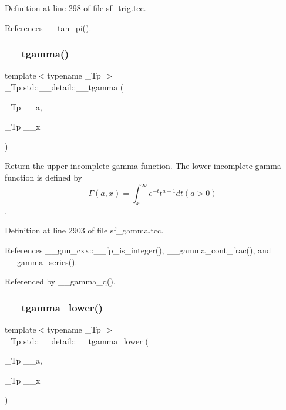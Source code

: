 Definition at line 298 of file sf\+\_\+trig.\+tcc.



References \+\_\+\+\_\+tan\+\_\+pi().

\mbox{\label{namespacestd_1_1____detail_ad2f6546e22348b07d992d522153d7d6b}} 
\subsubsection{\texorpdfstring{\+\_\+\+\_\+tgamma()}{\_\_tgamma()}}
{\footnotesize\ttfamily template$<$typename \+\_\+\+Tp $>$ \\
\+\_\+\+Tp std\+::\+\_\+\+\_\+detail\+::\+\_\+\+\_\+tgamma (\begin{DoxyParamCaption}\item[{\+\_\+\+Tp}]{\+\_\+\+\_\+a,  }\item[{\+\_\+\+Tp}]{\+\_\+\+\_\+x }\end{DoxyParamCaption})}



Return the upper incomplete gamma function. The lower incomplete gamma function is defined by \[ \Gamma(a,x) = \int_x^\infty e^{-t}t^{a-1}dt (a > 0) \]. 



Definition at line 2903 of file sf\+\_\+gamma.\+tcc.



References \+\_\+\+\_\+gnu\+\_\+cxx\+::\+\_\+\+\_\+fp\+\_\+is\+\_\+integer(), \+\_\+\+\_\+gamma\+\_\+cont\+\_\+frac(), and \+\_\+\+\_\+gamma\+\_\+series().



Referenced by \+\_\+\+\_\+gamma\+\_\+q().

\mbox{\label{namespacestd_1_1____detail_ad85ad5ffdb1bab9b1e3b6fd7a114fb0d}} 
\subsubsection{\texorpdfstring{\+\_\+\+\_\+tgamma\+\_\+lower()}{\_\_tgamma\_lower()}}
{\footnotesize\ttfamily template$<$typename \+\_\+\+Tp $>$ \\
\+\_\+\+Tp std\+::\+\_\+\+\_\+detail\+::\+\_\+\+\_\+tgamma\+\_\+lower (\begin{DoxyParamCaption}\item[{\+\_\+\+Tp}]{\+\_\+\+\_\+a,  }\item[{\+\_\+\+Tp}]{\+\_\+\+\_\+x }\end{DoxyParamCaption})}



